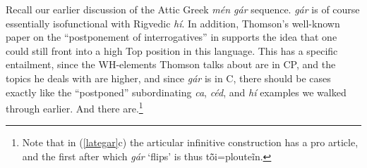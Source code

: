 \documentclass[output=paper,
modfonts
]{LSP/langsci}
\begin{document}
Recall our earlier discussion of the Attic Greek \textit{mén gár}  sequence. \textit{gár} is of course essentially
isofunctional with Rigvedic \textit{hí}. In addition, Thomson's \citeyearpar{thomson1939} well-known paper on the ``postponement of
interrogatives'' in  supports
the idea that one could still front into a high Top position in this language. This has a specific
entailment, since the WH-elements Thomson talks about are in CP, and the topics he deals with are higher, and
since \textit{gár} is in C, there should be  cases exactly like the ``postponed'' subordinating \textit{ca},
\textit{céd}, and \textit{hí} examples we walked through earlier. And there are.\footnote{Note that in (\ref{lategar}c)
the articular infinitive construction has a pro article, and the first  after which
\textit{gár} `flips' is thus tō̃i=plouteĩn.}


\end{document}
